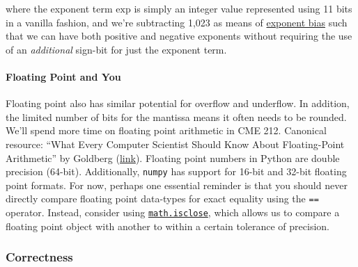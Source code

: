 \documentclass[12pt,letterpaper,twoside]{article}
\begin{document}
where the exponent term $\textrm{exp}$ is simply an integer value
represented using 11 bits in a vanilla fashion, and we're subtracting
1,023 as means of
\href{https://en.wikipedia.org/wiki/Exponent_bias}{exponent bias} such
that we can have both positive and negative exponents without
requiring the use of an \emph{additional} sign-bit for just the
exponent term.

\paragraph{Floating Point and You}
Floating point also has similar potential for overflow and underflow.
In addition, the limited number of bits for the mantissa means it
often needs to be rounded.
We'll spend more time on floating point arithmetic in CME 212.
Canonical resource: ``What Every Computer Scientist Should Know About
Floating-Point Arithmetic'' by Goldberg
(\href{https://ece.uwaterloo.ca/~dwharder/NumericalAnalysis/02Numerics/Double/paper.pdf}{link}).
Floating point numbers in Python are double precision (64-bit).
Additionally, \texttt{numpy} has support for 16-bit and 32-bit
floating point formats.
For now, perhaps one essential reminder is that you should never
directly compare floating point data-types for exact equality using
the \texttt{==} operator. Instead, consider using
\href{https://docs.python.org/3/library/math.html#math.isclose}{\texttt{math.isclose}},
which allows us to compare a floating point object with another to
within a certain tolerance of precision.

\vspace{-2ex}
\subsubsection{Correctness}
\end{document}
